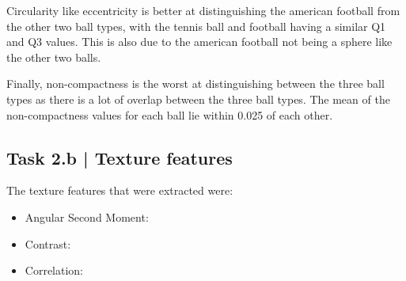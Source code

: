 \documentclass[conference]{IEEEtran}
\begin{document}
        Circularity like eccentricity is better at distinguishing the american football from the other two ball types, with the tennis ball and football having a similar Q1 and Q3 values.
        This is also due to the american football not being a sphere like the other two balls.

        Finally, non-compactness is the worst at distinguishing between the three ball types as there is a lot of overlap between the three ball types.
        The mean of the non-compactness values for each ball lie within 0.025 of each other.

    \subsection*{Task 2.b | Texture features}

        The texture features that were extracted were:
        \begin{itemize}
            \item Angular Second Moment:
            \item Contrast:
            \item Correlation:
        \end{itemize}
\end{document}
